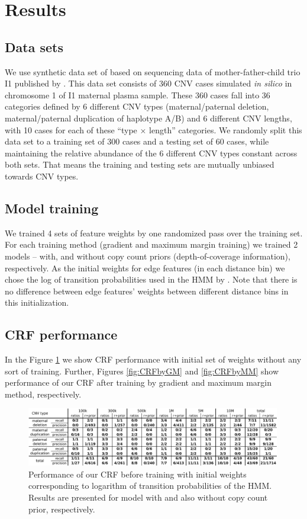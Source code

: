 \section{Results}

\subsection{Data sets}
We use synthetic data set of \cite{rampasek2014fcnv} based on sequencing data of mother-father-child trio I1 published by \cite{kitzman2012}. This data set consists of 360 CNV cases simulated \textit{in silico} in chromosome 1 of I1 maternal plasma sample. These 360 cases fall into 36 categories defined by 6 different CNV types (maternal/paternal deletion, maternal/paternal duplication of haplotype A/B) and 6 different CNV lengths, with 10 cases for each of these ``type $\times$ length'' categories. We randomly split this data set to a training set of 300 cases and a testing set of 60 cases, while maintaining the relative abundance of the 6 different CNV types constant across both sets. That means the training and testing sets are mutually unbiased towards CNV types.

\subsection{Model training}
We trained 4 sets of feature weights by one randomized pass over the training set. For each training method (gradient and maximum margin training) we trained 2 models -- with, and without copy count priors (depth-of-coverage information), respectively. As the initial weights for edge features (in each distance bin) we chose the log of transition probabilities used in the HMM by \cite{rampasek2014fcnv}. Note that there is no difference between edge features' weights between different distance bins in this initialization.

\subsection{CRF performance}
In the Figure \ref{fig:CRFinit} we show CRF performance with initial set of weights without any sort of training. Further, Figures \ref{fig:CRFbyGM} and \ref{fig:CRFbyMM} show performance of our CRF after training by gradient and maximum margin method, respectively.

\begin{figure}
\caption{Performance of our CRF before training with initial weights corresponding to logarithm of transition probabilities of the HMM. Results are presented for model with and also without copy count prior, respectively.}
\label{fig:CRFinit}
\centering
\includegraphics[width=0.99\textwidth]{figures/crf_initial_w}
\end{figure}

